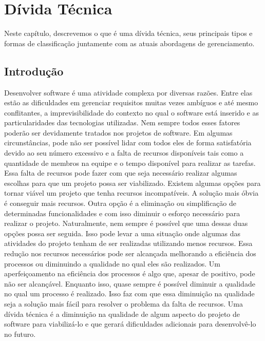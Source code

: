 \chapter{Dívida Técnica}
\label{cap:cap2}

Neste capítulo, descrevemos o que é uma dívida técnica, seus principais tipos e formas de classificação juntamente com as atuais abordagens de gerenciamento.


\section{Introdução}


Desenvolver software é uma atividade complexa por diversas razões. Entre elas estão as dificuldades em gerenciar requisitos muitas vezes ambíguos e até mesmo conflitantes, a imprevisibilidade do contexto no qual o software está inserido e as particularidades das tecnologias utilizadas. Nem sempre todos esses fatores poderão ser devidamente tratados nos projetos de software. Em algumas circunstâncias, pode não ser possível lidar com todos eles de forma satisfatória devido ao seu número excessivo e a falta de recursos disponíveis tais como a quantidade de membros na equipe e o tempo disponível para realizar as tarefas. Essa falta de recursos pode fazer com que seja necessário realizar algumas escolhas para que um projeto possa ser viabilizado. Existem algumas opções para tornar viável um projeto que tenha recursos incompatíveis.  A solução mais óbvia é conseguir mais recursos. Outra opção é a eliminação ou simplificação  de determinadas funcionalidades e com isso diminuir o esforço necessário para realizar o projeto.   Naturalmente, nem sempre é possível que uma dessas duas opções possa ser seguida. Isso pode levar a uma situação onde algumas das atividades do projeto tenham de ser realizadas utilizando menos recursos. Essa redução nos recursos necessários pode ser alcançada melhorando a eficiência dos processos ou diminuindo a qualidade no qual eles são realizados. Um aperfeiçoamento na eficiência dos processos é algo que, apesar de positivo, pode não ser alcançável. Enquanto isso, quase sempre é possível diminuir a qualidade no qual um processo é realizado. Isso faz com que essa diminuição na qualidade seja a solução mais fácil para resolver o problema da falta de recursos. Uma dívida técnica é a diminuição na qualidade de algum aspecto do projeto de software para viabilizá-lo e que gerará dificuldades adicionais para  desenvolvê-lo no futuro.


